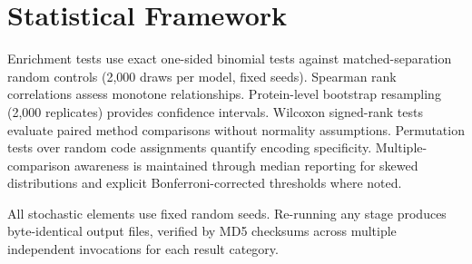 \section{Statistical Framework}
\label{sec:methods-eval}

Enrichment tests use exact one-sided binomial tests against
matched-separation random controls (2{,}000 draws per model, fixed seeds).
Spearman rank correlations assess monotone relationships.  Protein-level
bootstrap resampling (2{,}000 replicates) provides confidence intervals.
Wilcoxon signed-rank tests evaluate paired method comparisons without normality
assumptions.  Permutation tests over random code assignments quantify encoding
specificity.  Multiple-comparison awareness is maintained through median
reporting for skewed distributions and explicit Bonferroni-corrected thresholds
where noted.

All stochastic elements use fixed random seeds.  Re-running any stage produces
byte-identical output files, verified by MD5 checksums across multiple
independent invocations for each result category.
